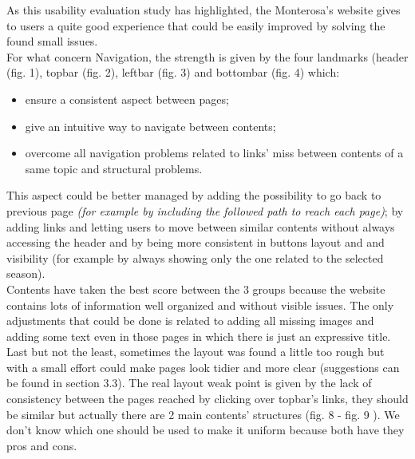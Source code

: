 As this usability evaluation study has highlighted, the Monterosa's website gives to users a quite good experience that could be easily improved by solving the found small issues.\\ 
For what concern Navigation, the strength is given by the four landmarks (header (fig. 1), topbar (fig. 2), leftbar (fig. 3) and bottombar (fig. 4)  which:
\begin{itemize}
	\item ensure a consistent aspect between pages;
	\item give an intuitive way to navigate between contents;
	\item overcome all navigation problems related to links' miss between contents of a same topic and structural problems.
\end{itemize}
This aspect could be better managed by adding the possibility to go back to previous page \emph{(for example by including the followed path to reach each page)}; by adding links and letting users to move between similar contents without always accessing the header and by being more consistent in buttons layout and and visibility (for example by always showing only the one related to the selected season).\\Contents have taken the best score between the 3 groups because the website contains lots of information well organized and without visible issues. The only adjustments that could be done is related to adding all missing images and adding some text even in those pages in which there is just an expressive title.\\ Last but not the least, sometimes the layout was found a little too rough but with a small effort could make pages look tidier and more clear (suggestions can be found in section 3.3). The real layout weak point is given by the lack of consistency between the pages reached by clicking over topbar's links,  they should be similar but actually there are 2 main contents' structures (fig. 8 - fig. 9 ). We don't know which one should be used to make it uniform because both have they pros and cons.


